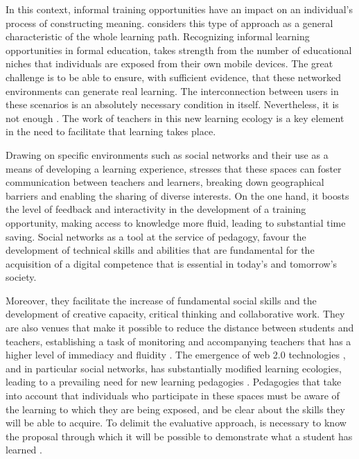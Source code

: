 \documentclass{textolivre}
\begin{document}
In this context, informal training opportunities have an impact on an individual's process of constructing meaning. \textcite{siemens2005}  considers this type of approach as a general characteristic of the whole learning path. Recognizing informal learning opportunities in formal education, takes strength from the number of educational niches that individuals are exposed from their own mobile devices. The great challenge is to be able to ensure, with sufficient evidence, that these networked environments can generate real learning. The interconnection between users in these scenarios is an absolutely necessary condition in itself. Nevertheless, it is not enough \cite{selwyn2010}. The work of teachers in this new learning ecology is a key element in the need to facilitate that learning takes place.

Drawing on specific environments such as social networks and their use as a means of developing a learning experience, \textcite{timothy2016} stresses that these spaces can foster communication between teachers and learners, breaking down geographical barriers and enabling the sharing of diverse interests. On the one hand, it boosts the level of feedback and interactivity in the development of a training opportunity, making access to knowledge more fluid, leading to substantial time saving. Social networks as a tool at the service of pedagogy, favour the development of technical skills and abilities that are fundamental for the acquisition of a digital competence that is essential in today's and tomorrow's society. 

Moreover, they facilitate the increase of fundamental social skills and the development of creative capacity, critical thinking and collaborative work. They are also venues that make it possible to reduce the distance between students and teachers, establishing a task of monitoring and accompanying teachers that has a higher level of immediacy and fluidity \cite{garcia2012,tejedor2012,timothy2016}. The emergence of web 2.0 technologies \cite{oreilly2005}, and in particular social networks, has substantially modified learning ecologies, leading to a prevailing need for new learning pedagogies \cite{casteneda2013}. Pedagogies that take into account that individuals who participate in these spaces must be aware of the learning to which they are being exposed, and be clear about the skills they will be able to acquire. To delimit the evaluative approach, is necessary to know the proposal through which it will be possible to demonstrate what a student has learned \cite{williams2011}.
\end{document}
